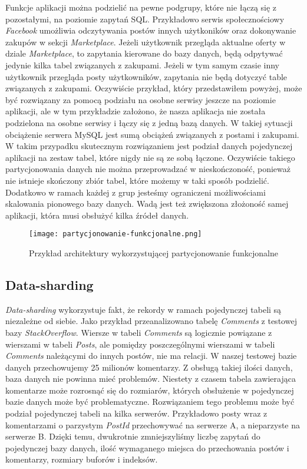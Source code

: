 Funkcje aplikacji można podzielić na pewne podgrupy, które nie łączą się z pozostałymi, na poziomie zapytań SQL. Przykładowo serwis społecznościowy \textit{Facebook} umożliwia odczytywania postów innych użytkoników oraz dokonywanie zakupów w sekcji \textit{Marketplace}. Jeżeli użytkownik przegląda aktualne oferty w dziale \textit{Marketplace}, to zapytania kierowane do bazy danych, będą odpytywać jedynie kilka tabel związanych z zakupami. Jeżeli w tym samym czasie inny użytkownik przegląda posty użytkowników, zapytania nie będą dotyczyć table związanych z zakupami. Oczywiście przykład, który przedstawiłem powyżej, może być rozwiązany za pomocą podziału na osobne serwisy jeszcze na poziomie aplikacji, ale w tym przykładzie założono, że nasza aplikacja nie została podzielona na osobne serwisy i łączy się z jedną bazą danych. W takiej sytuacji obciążenie serwera MySQL jest sumą obciążeń związanych z postami i zakupami. W takim przypadku skutecznym rozwiązaniem jest podział danych pojedynczej aplikacji na zestaw tabel, które nigdy nie są ze sobą łączone. Oczywiście takiego partycjonowania danych nie można przeprowadzać w nieskończoność, ponieważ nie istnieje skończony zbiór tabel, które możemy w taki sposób podzielić. Dodatkowo w ramach każdej z grup jesteśmy ograniczeni możliwościami skalowania pionowego bazy danych. Wadą jest też zwiększona złożoność samej aplikacji, która musi obsłużyć kilka źródeł danych. 

\begin{figure}
	\centering
	\texttt{[image: partycjonowanie-funkcjonalne.png]} 
	\caption{Przykład architektury wykorzystującej partycjonowanie funkcjonalne}
\end{figure}


\subsection{Data-sharding}
 
\textit{Data-sharding} wykorzystuje fakt, że rekordy w ramach pojedynczej tabeli są niezależne od siebie. Jako przykład przeanalizowano tabelę \textit{Comments} z testowej bazy \textit{StackOverflow}.
Wiersze w tabeli \textit{Comments} są logicznie powiązane z wierszami w tabeli \textit{Posts}, ale pomiędzy poszczególnymi wierszami w tabeli \textit{Comments} należącymi do innych postów, nie ma relacji. W naszej testowej bazie danych przechowujemy 25 milionów komentarzy. Z obsługą takiej ilości danych, baza danych nie powinna mieć problemów. Niestety z czasem tabela zawierająca komentarze może rozrosnąć się do rozmiarów, których obsłużenie w pojedynczej bazie danych może być problematyczne. Rozwiązaniem tego problemu może być podział pojedynczej tabeli na kilka serwerów. Przykładowo posty wraz z komentarzami o parzystym \textit{PostId} przechowywać na serwerze A, a nieparzyste na serwerze B. Dzięki temu, dwukrotnie zmniejszyliśmy liczbę zapytań do pojedynczej bazy danych, ilość wymaganego miejsca do przechowania postów i komentarzy, rozmiary buforów i indeksów. 

